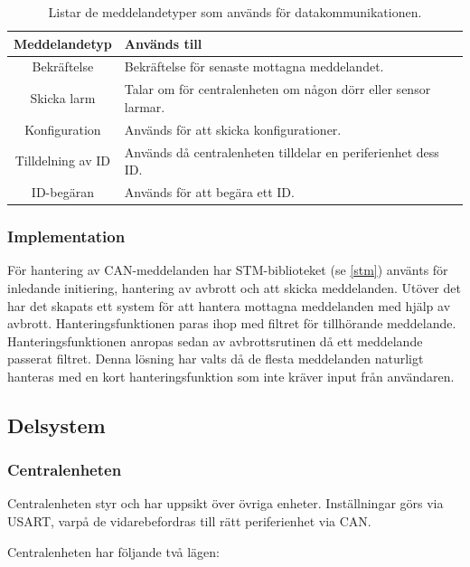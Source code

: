 \documentclass{article}
\begin{document}
\begin{table}[H]
	\centering
	\begin{tabular}{|c|p{}|}
		\hline
		Meddelandetyp & Används till \\ \hline \hline
		Bekräftelse		& Bekräftelse för senaste mottagna meddelandet. \\ \hline
		Skicka larm		& Talar om för centralenheten om någon dörr eller sensor larmar. \\ \hline
		Konfiguration		& Används för att skicka konfigurationer. \\ \hline
		Tilldelning av ID		& Används då centralenheten tilldelar en periferienhet dess ID. \\ \hline
		ID-begäran		& Används för att begära ett ID. \\ \hline

	\end{tabular}
	\caption{Listar de meddelandetyper som används för datakommunikationen.}
	\label{tab:meddelandetyper}
\end{table}


\subsubsection{Implementation}
För hantering av CAN-meddelanden har STM-biblioteket (se \ref{stm}) använts för inledande initiering, hantering av avbrott och att skicka meddelanden.
Utöver det har det skapats ett system för att hantera mottagna meddelanden med hjälp av avbrott. Hanteringsfunktionen paras ihop med filtret för tillhörande meddelande.
Hanteringsfunktionen anropas sedan av avbrottsrutinen då ett meddelande passerat filtret.
Denna lösning har valts då de flesta meddelanden naturligt hanteras med en kort hanteringsfunktion som inte kräver input från användaren.



\subsection{Delsystem }
\subsubsection{Centralenheten}
Centralenheten styr och har uppsikt över övriga enheter.
 Inställningar görs via USART, varpå de vidarebefordras till rätt periferienhet via CAN.

Centralenheten har följande två lägen:
\end{document}
